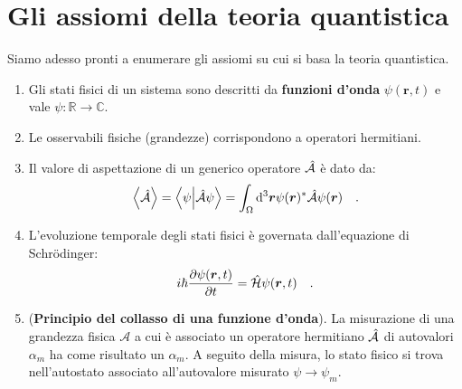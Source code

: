 \section{Gli assiomi della teoria quantistica}
Siamo adesso pronti a enumerare gli assiomi su cui si basa la teoria quantistica. 
\begin{enumerate}[label=\roman*.]
    \item Gli stati fisici di un sistema sono descritti da \textbf{funzioni d'onda} $\psi(\bm{r},t)$ e vale  $ \psi: \mathbb{R} \to \mathbb{C}$.
    \item Le osservabili fisiche (grandezze) corrispondono a operatori hermitiani.
    \item Il valore di aspettazione di un generico operatore $\hat{\mathcal{A}}$ è dato da:
        \[
            \left\langle \hat{\mathcal{A}} \right\rangle = \braket{\psi}{\hat{\mathcal{A}}\psi} = \int_\Omega \dd^3{\bm{r}} \psi(\bm{r})^*\hat{\mathcal{A}}\psi(\bm{r}) \quad.
        \]
    \item L'evoluzione temporale degli stati fisici è governata dall'equazione di Schrödinger:
    \[
        i\hbar \pdv{\psi(\bm{r},t)}{t} = \hat{\mathcal{H}}\psi(\bm{r},t) \quad.
    \]
    \item (\textbf{Principio del collasso di una funzione d'onda}). La misurazione di una grandezza fisica $\mathcal{A}$ a cui è associato un operatore hermitiano $\hat{\mathcal{A}}$ di autovalori $\alpha_m$ ha come risultato un $\alpha_m$. A seguito della misura, lo stato fisico si trova nell'autostato associato all'autovalore misurato $\psi \to \psi_m$.
\end{enumerate}